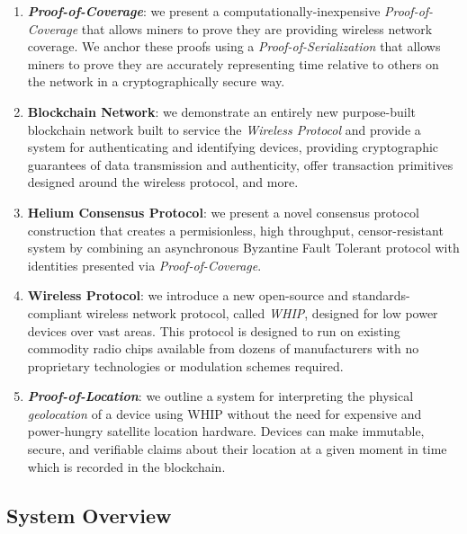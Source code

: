 \documentclass[10pt, nonatbib, nocopyrightspace, reprint]{sigplanconf}
\begin{document}
\begin{enumerate}
  \item \textbf{\emph{Proof-of-Coverage}}: we present a computationally-inexpensive \emph{Proof-of-Coverage} that allows miners to prove they are providing wireless network coverage. We anchor these proofs using a \emph{Proof-of-Serialization} that allows miners to prove they are accurately representing time relative to others on the network in a cryptographically secure way.

  \item \textbf{Blockchain Network}: we demonstrate an entirely new purpose-built blockchain network built to service the \emph{Wireless Protocol} and provide a system for authenticating and identifying devices, providing cryptographic guarantees of data transmission and authenticity, offer transaction primitives designed around the wireless protocol, and more.

  \item \textbf{Helium Consensus Protocol}: we present a novel consensus protocol construction that creates a permisionless, high throughput, censor-resistant system by combining an asynchronous Byzantine Fault Tolerant protocol with identities presented via \emph{Proof-of-Coverage}. 

  \item \textbf{Wireless Protocol}: we introduce a new open-source and standards-compliant wireless network protocol, called \emph{WHIP}, designed for low power devices over vast areas. This protocol is designed to run on existing commodity radio chips available from dozens of manufacturers with no proprietary technologies or modulation schemes required.

  \item \textbf{\emph{Proof-of-Location}}: we outline a system for interpreting the physical \emph{geolocation} of a device using WHIP without the need for expensive and power-hungry satellite location hardware. Devices can make immutable, secure, and verifiable claims about their location at a given moment in time which is recorded in the blockchain.
\end{enumerate}

\subsection{System Overview}
\end{document}
